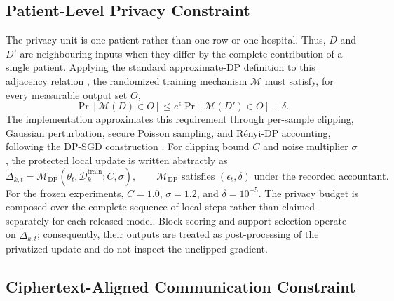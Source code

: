 \subsection{Patient-Level Privacy Constraint}
\label{subsec:problem-privacy-constraint}

The privacy unit is one patient rather than one row or one hospital. Thus, $D$ and $D'$ are neighbouring inputs when they differ by the complete contribution of a single patient. Applying the standard approximate-DP definition to this adjacency relation \cite{dwork2006calibrating}, the randomized training mechanism $\mathcal{M}$ must satisfy, for every measurable output set $O$,
\begin{equation}
    \Pr[\mathcal{M}(D)\in O]
    \leq e^{\epsilon}\Pr[\mathcal{M}(D')\in O]+\delta.
    \label{eq:patient-level-dp-definition}
\end{equation}
The implementation approximates this requirement through per-sample clipping, Gaussian perturbation, secure Poisson sampling, and Rényi-DP accounting, following the DP-SGD construction \cite{dwork2006calibrating,abadi2016deep}. For clipping bound $C$ and noise multiplier $\sigma$, the protected local update is written abstractly as
\begin{equation}
    \widetilde{\Delta}_{k,t}
    =\mathcal{M}_{\mathrm{DP}}
      (\theta_t,\mathcal{D}_k^{\mathrm{train}};C,\sigma),
    \qquad
    \mathcal{M}_{\mathrm{DP}}\text{ satisfies }(\epsilon_t,\delta)
    \text{ under the recorded accountant.}
    \label{eq:private-local-update}
\end{equation}
For the frozen experiments, $C=1.0$, $\sigma=1.2$, and $\delta=10^{-5}$. The privacy budget is composed over the complete sequence of local steps rather than claimed separately for each released model. Block scoring and support selection operate on $\widetilde{\Delta}_{k,t}$; consequently, their outputs are treated as post-processing of the privatized update and do not inspect the unclipped gradient.

\subsection{Ciphertext-Aligned Communication Constraint}
\label{subsec:problem-communication-constraint}

